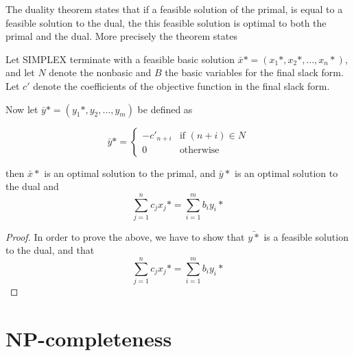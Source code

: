 \documentclass[10pt]{article}
\begin{document}
The duality theorem states that if a feasible solution of the primal, is equal to a feasible solution to the dual, the this feasible solution is optimal to both the primal and the dual. More precisely the theorem states

\begin{theorem}
Let SIMPLEX terminate with a feasible basic solution $\bar{x}*=(x_1*,x_2*,\ldots,x_n*)$, and let $N$ denote the nonbasic and $B$ the basic variables for the final slack form. Let $c'$ denote the coefficients of the objective function in the final slack form. 

Now let $\bar{y}* = (y_1*,y_2,\ldots,y_m)$ be defined as

\begin{equation} 
\bar{y}* = 
\left\{
\begin{array}{rl} 
  -c'_{n+i} & \text{if } (n+i) \in N \\
   0 & \text{otherwise}
\end{array} 
\right. 
\end{equation} 

then $\bar{x}*$ is an optimal solution to the primal, and $\bar{y}*$ is an optimal solution to the dual and
\begin{equation}
  \sum_{j=1}^n c_jx_j* = \sum_{i=1}^m b_iy_i*
\end{equation}
\end{theorem}

\begin{proof}
In order to prove the above, we have to show that $\bar{y*}$ is a feasible solution to the dual, and that 
\begin{equation}
  \sum_{j=1}^n c_jx_j* = \sum_{i=1}^m b_iy_i*  
\end{equation}
\end{proof}
 


\clearpage \newpage
\section{NP-completeness} %
\label{sec:np_completeness}
\end{document}
